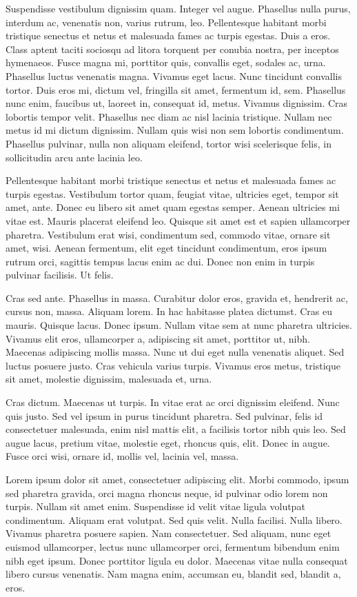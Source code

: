 Suspendisse vestibulum dignissim quam. Integer vel augue. Phasellus nulla
purus, interdum ac, venenatis non, varius rutrum, leo. Pellentesque habitant
morbi tristique senectus et netus et malesuada fames ac turpis egestas. Duis a
eros. Class aptent taciti sociosqu ad litora torquent per conubia nostra, per
inceptos hymenaeos. Fusce magna mi, porttitor quis, convallis eget, sodales ac,
urna. Phasellus luctus venenatis magna. Vivamus eget lacus. Nunc tincidunt
convallis tortor. Duis eros mi, dictum vel, fringilla sit amet, fermentum id,
sem. Phasellus nunc enim, faucibus ut, laoreet in, consequat id, metus. Vivamus
dignissim. Cras lobortis tempor velit. Phasellus nec diam ac nisl lacinia
tristique. Nullam nec metus id mi dictum dignissim. Nullam quis wisi non sem
lobortis condimentum. Phasellus pulvinar, nulla non aliquam eleifend, tortor
wisi scelerisque felis, in sollicitudin arcu ante lacinia leo.

Pellentesque habitant morbi tristique senectus et netus et malesuada fames ac
turpis egestas. Vestibulum tortor quam, feugiat vitae, ultricies eget, tempor
sit amet, ante. Donec eu libero sit amet quam egestas semper. Aenean ultricies
mi vitae est. Mauris placerat eleifend leo. Quisque sit amet est et sapien
ullamcorper pharetra. Vestibulum erat wisi, condimentum sed, commodo vitae,
ornare sit amet, wisi. Aenean fermentum, elit eget tincidunt condimentum, eros
ipsum rutrum orci, sagittis tempus lacus enim ac dui. Donec non enim in turpis
pulvinar facilisis. Ut felis.

Cras sed ante. Phasellus in massa. Curabitur dolor eros, gravida et, hendrerit
ac, cursus non, massa. Aliquam lorem. In hac habitasse platea dictumst. Cras eu
mauris. Quisque lacus. Donec ipsum. Nullam vitae sem at nunc pharetra
ultricies. Vivamus elit eros, ullamcorper a, adipiscing sit amet, porttitor ut,
nibh. Maecenas adipiscing mollis massa. Nunc ut dui eget nulla venenatis
aliquet. Sed luctus posuere justo. Cras vehicula varius turpis. Vivamus eros
metus, tristique sit amet, molestie dignissim, malesuada et, urna.

Cras dictum. Maecenas ut turpis. In vitae erat ac orci dignissim eleifend. Nunc
quis justo. Sed vel ipsum in purus tincidunt pharetra. Sed pulvinar, felis id
consectetuer malesuada, enim nisl mattis elit, a facilisis tortor nibh quis
leo. Sed augue lacus, pretium vitae, molestie eget, rhoncus quis, elit. Donec
in augue. Fusce orci wisi, ornare id, mollis vel, lacinia vel, massa.

Lorem ipsum dolor sit amet, consectetuer adipiscing elit. Morbi commodo, ipsum
sed pharetra gravida, orci magna rhoncus neque, id pulvinar odio lorem non
turpis. Nullam sit amet enim. Suspendisse id velit vitae ligula volutpat
condimentum. Aliquam erat volutpat. Sed quis velit. Nulla facilisi. Nulla
libero. Vivamus pharetra posuere sapien. Nam consectetuer. Sed aliquam, nunc
eget euismod ullamcorper, lectus nunc ullamcorper orci, fermentum bibendum enim
nibh eget ipsum. Donec porttitor ligula eu dolor. Maecenas vitae nulla
consequat libero cursus venenatis. Nam magna enim, accumsan eu, blandit sed,
blandit a, eros.



